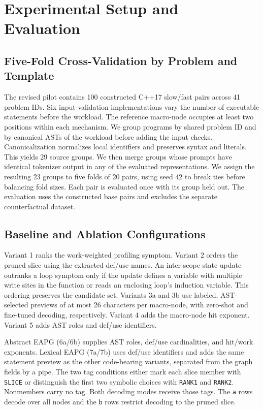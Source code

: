 \documentclass[10pt,conference]{IEEEtran}
\begin{document}
\section{Experimental Setup and Evaluation}
\label{sec:experimental_setup}

\subsection{Five-Fold Cross-Validation by Problem and Template}
The revised pilot contains 100 constructed C++17 slow/fast pairs across 41 problem IDs. Six input-validation implementations vary the number of executable statements before the workload. The reference macro-node occupies at least two positions within each mechanism. We group programs by shared problem ID and by canonical ASTs of the workload before adding the input checks. Canonicalization normalizes local identifiers and preserves syntax and literals. This yields 29 source groups. We then merge groups whose prompts have identical tokenizer output in any of the evaluated representations. We assign the resulting 23 groups to five folds of 20 pairs, using seed 42 to break ties before balancing fold sizes. Each pair is evaluated once with its group held out. The evaluation uses the constructed base pairs and excludes the separate counterfactual dataset.

\subsection{Baseline and Ablation Configurations}
Variant 1 ranks the work-weighted profiling symptom. Variant 2 orders the pruned slice using the extracted def/use names. An inter-scope state update outranks a loop symptom only if the update defines a variable with multiple write sites in the function or reads an enclosing loop's induction variable. This ordering preserves the candidate set. Variants 3a and 3b use labeled, AST-selected previews of at most 26 characters per macro-node, with zero-shot and fine-tuned decoding, respectively. Variant 4 adds the macro-node hit exponent. Variant 5 adds AST roles and def/use identifiers.

Abstract EAPG (6a/6b) supplies AST roles, def/use cardinalities, and hit/work exponents. Lexical EAPG (7a/7b) uses def/use identifiers and adds the same statement preview as the other code-bearing variants, separated from the graph fields by a pipe. The two tag conditions either mark each slice member with \texttt{SLICE} or distinguish the first two symbolic choices with \texttt{RANK1} and \texttt{RANK2}. Nonmembers carry no tag. Both decoding modes receive those tags. The \texttt{a} rows decode over all nodes and the \texttt{b} rows restrict decoding to the pruned slice.
\end{document}

